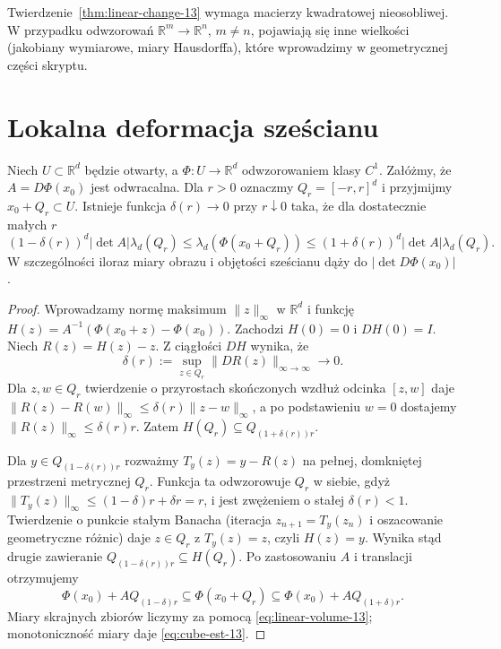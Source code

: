 \begin{uwaga}
Twierdzenie~\ref{thm:linear-change-13} wymaga
macierzy kwadratowej nieosobliwej. W przypadku odwzorowań
$\mathbb R^m\to\mathbb R^n$, $m\ne n$, pojawiają się
inne wielkości (jakobiany wymiarowe, miary Hausdorffa),
które wprowadzimy w geometrycznej części skryptu.
\end{uwaga}

\section{Lokalna deformacja sześcianu}

\begin{lemat}
\label{lem:small-cube-13}
Niech $U\subset\mathbb R^d$ będzie otwarty, a
$\Phi:U\to\mathbb R^d$ odwzorowaniem klasy $C^1$.
Załóżmy, że $A=D\Phi(x_0)$ jest odwracalna.
Dla $r>0$ oznaczmy $Q_r=[-r,r]^d$ i przyjmijmy
$x_0+Q_r\subset U$. Istnieje funkcja $\delta(r)\to0$
przy $r\downarrow0$ taka, że dla dostatecznie małych $r$
\begin{equation}\label{eq:cube-est-13}
(1-\delta(r))^d|\det A|\lambda_d(Q_r)
\le \lambda_d(\Phi(x_0+Q_r))
\le(1+\delta(r))^d|\det A|\lambda_d(Q_r).
\end{equation}
W szczególności iloraz miary obrazu i objętości sześcianu
dąży do $|\det D\Phi(x_0)|$.
\end{lemat}
\begin{proof}
Wprowadzamy normę maksimum $\|z\|_\infty$ w $\mathbb R^d$
i funkcję $H(z)=A^{-1}(\Phi(x_0+z)-\Phi(x_0))$.
Zachodzi $H(0)=0$ i $DH(0)=I$.
Niech $R(z)=H(z)-z$. Z ciągłości $DH$ wynika, że
\[
\delta(r):=\sup_{z\in Q_r}\|DR(z)\|_{\infty\to\infty}
\longrightarrow0.
\]
Dla $z,w\in Q_r$ twierdzenie o przyrostach skończonych
wzdłuż odcinka $[z,w]$ daje
$\|R(z)-R(w)\|_\infty\le\delta(r)\|z-w\|_\infty$,
a po podstawieniu $w=0$ dostajemy
$\|R(z)\|_\infty\le\delta(r)r$.
Zatem $H(Q_r)\subseteq Q_{(1+\delta(r))r}$.

Dla $y\in Q_{(1-\delta(r))r}$ rozważmy
$T_y(z)=y-R(z)$ na pełnej, domkniętej przestrzeni
metrycznej $Q_r$. Funkcja ta odwzorowuje $Q_r$ w siebie,
gdyż $\|T_y(z)\|_\infty\le(1-\delta)r+\delta r=r$,
i jest zwężeniem o stałej $\delta(r)<1$.
Twierdzenie o punkcie stałym Banacha (iteracja
$z_{n+1}=T_y(z_n)$ i oszacowanie geometryczne różnic)
daje $z\in Q_r$ z $T_y(z)=z$, czyli $H(z)=y$.
Wynika stąd drugie zawieranie
$Q_{(1-\delta(r))r}\subseteq H(Q_r)$.
Po zastosowaniu $A$ i translacji otrzymujemy
\[
\Phi(x_0)+A Q_{(1-\delta)r}
\subseteq\Phi(x_0+Q_r)
\subseteq\Phi(x_0)+A Q_{(1+\delta)r}.
\]
Miary skrajnych zbiorów liczymy za pomocą
\eqref{eq:linear-volume-13}; monotoniczność miary
daje \eqref{eq:cube-est-13}.
\end{proof}

